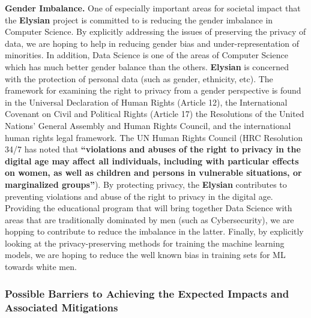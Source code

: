 \documentclass[a4paper,11pt]{article}
\newcommand{\project}[1]{\textbf{#1}\xspace}
\newcommand{\SECURITY}{\project{Elysian}}
\newcommand{\TheProject}{\SECURITY}
\begin{document}
\begin{mdframed}[backgroundcolor=blue!5]
\label{box:gender}
\textbf{Gender Imbalance.} One of especially important areas for societal impact that the \TheProject{} project is committed to is reducing the gender imbalance in Computer Science. By explicitly addressing the issues of preserving the privacy of data, we are hoping to help in reducing gender bias and under-representation of minorities. In addition, Data Science is one of the areas of Computer Science which has much better gender balance than the others. 
%
\TheProject{} is concerned with the protection of personal data (such as gender, ethnicity, etc). The framework for examining the right to privacy from a gender perspective is found in the Universal Declaration of Human Rights (Article 12), the International Covenant on Civil and Political Rights (Article 17) the Resolutions of the United Nations' General Assembly and Human Rights Council, and the international human rights legal framework. The UN Human Rights Council (HRC Resolution 34/7 has noted that \textbf{``violations and abuses of the right to privacy in the digital age may affect all individuals, including with particular effects on women, as well as children and persons in vulnerable situations, or marginalized groups''}). By protecting privacy, the \TheProject{} contributes to preventing violations and abuse of the right to privacy in the digital age.    %
Providing the educational program that will bring together Data Science with areas that are traditionally dominated by men (such as Cybersecurity), we are hopping to contribute to reduce the imbalance in the latter. Finally, by explicitly looking at the privacy-preserving methods for training the machine learning models, we are hoping to reduce the well known bias in training sets for ML towards white men.  
\end{mdframed}
 

\noindent
\subsubsection*{Possible Barriers to Achieving the Expected Impacts and Associated Mitigations}

\end{document}
